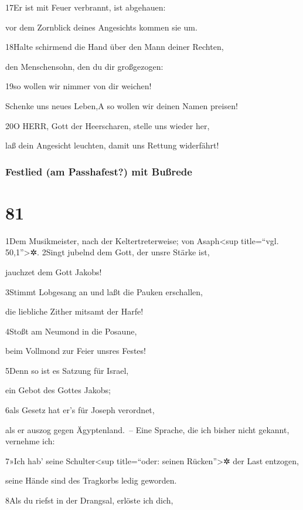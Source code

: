 17Er ist mit Feuer verbrannt, ist abgehauen:

vor dem Zornblick deines Angesichts kommen sie um.

18Halte schirmend die Hand über den Mann deiner Rechten,

den Menschensohn, den du dir großgezogen:

19so wollen wir nimmer von dir weichen!

Schenke uns neues Leben,{A} so wollen wir deinen Namen preisen!

20O HERR, Gott der Heerscharen, stelle uns wieder her,

laß dein Angesicht leuchten, damit uns Rettung widerfährt!

\hypertarget{festlied-am-passhafest-mit-buuxdfrede}{%
\subsubsection{Festlied (am Passhafest?) mit
Bußrede}\label{festlied-am-passhafest-mit-buuxdfrede}}

\hypertarget{section-80}{%
\section{81}\label{section-80}}

1Dem Musikmeister, nach der Keltertreterweise; von Asaph\textless sup
title=``vgl. 50,1''\textgreater✲. 2Singt jubelnd dem Gott, der unsre
Stärke ist,

jauchzet dem Gott Jakobs!

3Stimmt Lobgesang an und laßt die Pauken erschallen,

die liebliche Zither mitsamt der Harfe!

4Stoßt am Neumond in die Posaune,

beim Vollmond zur Feier unsres Festes!

5Denn so ist es Satzung für Israel,

ein Gebot des Gottes Jakobs;

6als Gesetz hat er's für Joseph verordnet,

als er auszog gegen Ägyptenland.~-- Eine Sprache, die ich bisher nicht
gekannt, vernehme ich:

7»Ich hab' seine Schulter\textless sup title=``oder: seinen
Rücken''\textgreater✲ der Last entzogen,

seine Hände sind des Tragkorbs ledig geworden.

8Als du riefst in der Drangsal, erlöste ich dich,

